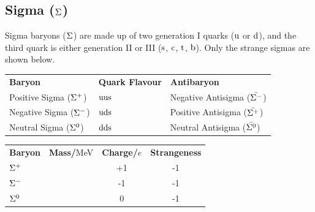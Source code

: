     \subsection{Sigma (\texorpdfstring{$\sigmabaryon$}.)} \label{zoo:sigma}
        Sigma baryons ($\sigmabaryon$) are made up of two generation I quarks ($\upquark$ or $\downquark$), and the third quark is either generation II or III ($\strangequark$, $\charmquark$, $\topquark$, $\bottomquark$).
        Only the strange sigmas are shown below. \\

        \begin{center}
        \begin{tabular}{l l l}
            \textbf{Baryon}                    & \textbf{Quark Flavour} & \textbf{Antibaryon} \\
            Positive Sigma ($\sigmabaryon[+]$) & $\baryonquarks[uus]$   & Negative Antisigma ($\antisigmabaryon[-]$) \\
            Negative Sigma ($\sigmabaryon[-]$) & $\baryonquarks[uds]$   & Positive Antisigma ($\antisigmabaryon[+]$) \\
            Neutral Sigma ($\sigmabaryon[0]$)  & $\baryonquarks[dds]$   & Neutral Antisigma ($\antisigmabaryon[0]$)
        \end{tabular}
        \end{center}

        \begin{center}
        \begin{tabular}{l c c c}
            \textbf{Baryon}        & \textbf{Mass/}MeV & \textbf{Charge/}$e$ & \textbf{Strangeness} \\
            $\sigmabaryon[+]$     &                   & +1                  & -1 \\
            $\sigmabaryon[-]$     &                   & -1                  & -1 \\
            $\sigmabaryon[0]$     &                   & 0                   & -1 \\
        \end{tabular}
        \end{center}